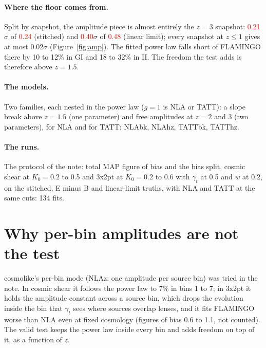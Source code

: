 \documentclass[11pt]{article}
\newif\ifnumbersfinal
\newcommand{\refresh}[1]{\ifnumbersfinal#1\else\textcolor{red}{#1}\fi}
\newcommand{\AmpS}{\refresh{0.24}}
\newcommand{\AmpL}{\refresh{0.48}}
\newcommand{\AmpThreeS}{\refresh{0.21}}
\newcommand{\AmpThreeL}{\refresh{0.40}}
\newcommand{\NLAzLo}{0.6}
\newcommand{\NLAzHi}{1.1}
\newcommand{\NFits}{134}
\newcommand{\Zb}{1.5}
\begin{document}
\paragraph{Where the floor comes from.}
Split by snapshot, the amplitude piece is almost entirely the $z = 3$
snapshot: \AmpThreeS$\sigma$ of \AmpS{} (stitched) and \AmpThreeL$\sigma$ of
\AmpL{} (linear limit); every snapshot at $z \le 1$ gives at most
$0.02\sigma$ (Figure~\ref{fig:amp}). The fitted power law falls short of
FLAMINGO there by 10 to 12\% in GI and 18 to 32\% in II. The freedom the
test adds is therefore above $z = \Zb$.

\paragraph{The models.}
Two families, each nested in the power law ($g = 1$ is NLA or TATT):
a slope break above $z = \Zb$ (one parameter) and free amplitudes at $z = 2$
and 3 (two parameters), for NLA and for TATT: NLAbk, NLAhz, TATTbk, TATThz.

\paragraph{The runs.}
The protocol of the note: total MAP figure of bias and the bias split, cosmic
shear at $K_0 = 0.2$ to 0.5 and 3x2pt at $K_0 = 0.2$ to 0.6 with $\gamma_t$
at 0.5 and $w$ at 0.2, on the stitched, E minus B and linear-limit truths,
with NLA and TATT at the same cuts: \NFits{} fits.

\section{Why per-bin amplitudes are not the test}
cosmolike's per-bin mode (NLAz: one amplitude per source bin) was tried in
the note. In cosmic shear it follows the power law to 7\% in bins 1 to 7; in
3x2pt it holds the amplitude constant across a source bin, which drops the
evolution inside the bin that $\gamma_t$ sees where sources overlap lenses,
and it fits FLAMINGO worse than NLA even at fixed cosmology (figures of bias
\NLAzLo{} to \NLAzHi, not counted). The valid test keeps the power law
inside every bin and adds freedom on top of it, as a function of $z$.
\end{document}
